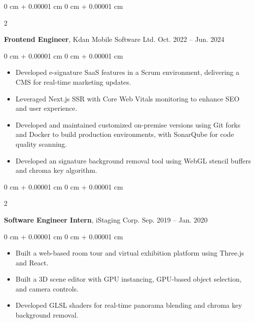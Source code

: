 \documentclass[10pt, letterpaper]{article}
\newenvironment{highlights}{
    \begin{itemize}[
        topsep=0.10 cm,
        parsep=0.10 cm,
        partopsep=0pt,
        itemsep=0pt,
        leftmargin=0 cm + 10pt
    ]
}{
    \end{itemize}
} %
\newenvironment{onecolentry}{
    \begin{adjustwidth}{
        0 cm + 0.00001 cm
    }{
        0 cm + 0.00001 cm
    }
}{
    \end{adjustwidth}
} %
\newenvironment{twocolentry}[2][]{
    \onecolentry
    \def\secondColumn{#2}
    \setcolumnwidth{\fill, 4.5 cm}
    \begin{paracol}{2}
}{
    \switchcolumn \raggedleft \secondColumn
    \end{paracol}
    \endonecolentry
} %
\begin{document}
        \begin{twocolentry}{
            Oct. 2022 – Jun. 2024
        }
            \textbf{Frontend Engineer}, Kdan Mobile Software Ltd.\end{twocolentry}

        \vspace{0.10 cm}
        \begin{onecolentry}
            \begin{highlights}
                \item Developed e-signature SaaS features in a Scrum environment, delivering a CMS for real-time marketing updates.
                \item Leveraged Next.js SSR with Core Web Vitals monitoring to enhance SEO and user experience.
                \item Developed and maintained customized on-premise versions using Git forks and Docker to build production environments, with SonarQube for code quality scanning.
                \item Developed an signature background removal tool using WebGL stencil buffers and chroma key algorithm.
            \end{highlights}
        \end{onecolentry}

        \vspace{0.2 cm}

        \begin{twocolentry}{
            Sep. 2019 – Jan. 2020
        }
            \textbf{Software Engineer Intern}, iStaging Corp.\end{twocolentry}

        \vspace{0.10 cm}
        \begin{onecolentry}
            \begin{highlights}
                \item Built a web-based room tour and virtual exhibition platform using Three.js and React.
                \item Built a 3D scene editor with GPU instancing, GPU-based object selection, and camera controls.
                \item Developed GLSL shaders for real-time panorama blending and chroma key background removal.
            \end{highlights}
        \end{onecolentry}

    
    
\end{document}
